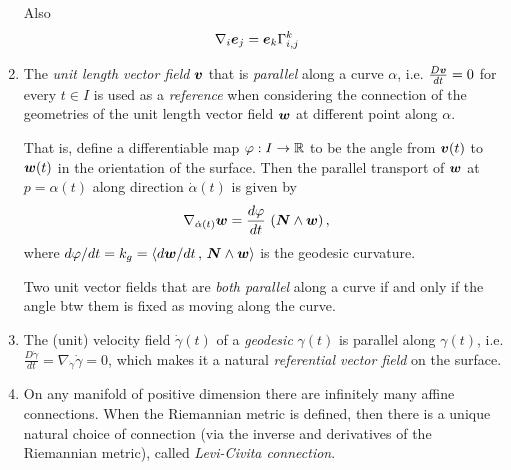 \documentclass[11pt]{article}
\begin{document}
\begin{enumerate}
Also \begin{align*}
\nabla_{i}\boldsymbol{e}_{j}&= \boldsymbol{e}_{k}\Gamma_{i,j}^{k}
\end{align*}


\item The \emph{unit length vector field} $\boldsymbol{v}$ that is \emph{parallel} along a curve $\alpha$, i.e.  $\frac{D\boldsymbol{v}}{dt} = 0$ for every $t\in I$ is used as a \emph{reference} when considering the connection of the geometries of the unit length vector field $\boldsymbol{w}$ at different point along $\alpha$. 

That is, define a differentiable map $\varphi: I \rightarrow {\mathbb R}$ to be the angle from $\boldsymbol{v}(t)$ to $\boldsymbol{w}(t)$ in the orientation of the surface. Then the parallel transport of $\boldsymbol{w}$ at $p=\alpha(t)$ along direction $\dot{\alpha}(t)$ is given by 
\begin{align*}
\nabla_{\dot{\alpha}(t)}\boldsymbol{w} &= \frac{d\varphi}{dt}\,\left(\boldsymbol{N}\wedge \boldsymbol{w}\right),
\end{align*}
where $d\varphi/dt = k_{g} = \left\langle d\boldsymbol{w}/dt\,,\, \boldsymbol{N}\wedge \boldsymbol{w} \right\rangle$ is the geodesic curvature. 

Two unit vector fields that are \emph{both parallel} along a curve if and only if the angle btw them is fixed as moving along the curve.



 
\item The (unit) velocity field $\dot{\gamma}(t)$ of a \emph{geodesic} $\gamma(t)$ is parallel along $\gamma(t)$, i.e. $\frac{D\dot{\gamma}}{dt} = \nabla_{\dot{\gamma}}\dot{\gamma} = 0$, which makes it a natural \emph{referential vector field} on the surface.\\[5pt]

\item On any manifold of positive dimension there are infinitely many affine connections. When the Riemannian metric is defined, then there is a unique natural choice of connection (via the inverse and derivatives of the Riemannian metric), called \emph{Levi-Civita connection}.
\end{enumerate}



\newpage


\end{document}
